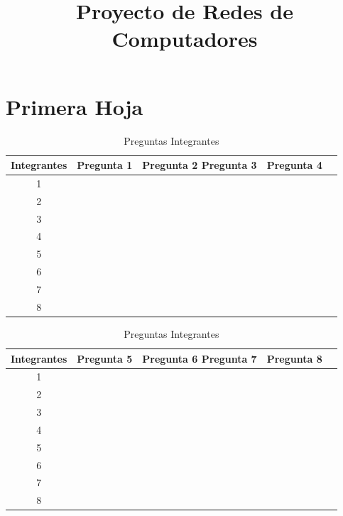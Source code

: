 \documentclass[]{article}
\title{Proyecto de Redes de Computadores}
\author{}
\begin{document}
\maketitle
\newpage

\section{Primera Hoja}
\begin{table}[h!]
  \begin{center}
    \caption{Preguntas Integrantes}
    \begin{tabular}{ccccc}
      \toprule
      \textbf{Integrantes} & \textbf{Pregunta 1} & \textbf{Pregunta 2}
      \textbf{Pregunta 3} & \textbf{Pregunta 4} \\
      \midrule
      1 &  &  \\
      2 &  &  \\
      3 &  &  \\
      4 &  &  \\
      5 &  &  \\
      6 &  &  \\
      7 &  &  \\
      8 &  &  \\
      \bottomrule
    \end{tabular}
  \end{center}
\end{table}

\begin{table}[h!]
  \begin{center}
    \caption{Preguntas Integrantes}
    \begin{tabular}{ccccc}
      \toprule
      \textbf{Integrantes} & \textbf{Pregunta 5} & \textbf{Pregunta 6}
      \textbf{Pregunta 7} & \textbf{Pregunta 8} \\
      \midrule
      1 &  &  \\
      2 &  &  \\
      3 &  &  \\
      4 &  &  \\
      5 &  &  \\
      6 &  &  \\
      7 &  &  \\
      8 &  &  \\
      \bottomrule
    \end{tabular}
  \end{center}
\end{table}
\end{document}
